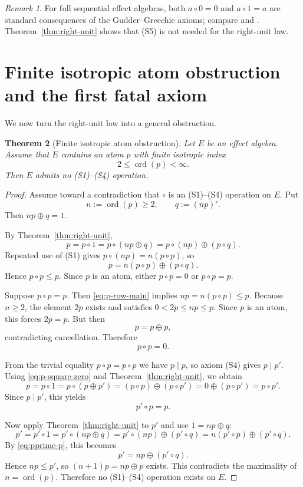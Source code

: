 \documentclass[11pt]{article}
\newtheorem{theorem}{Theorem}[section]
\theoremstyle{definition}
\theoremstyle{remark}
\newtheorem{remark}[theorem]{Remark}
\numberwithin{equation}{section}
\newcommand{\op}{\oplus}
\newcommand{\ord}{\operatorname{ord}}
\begin{document}
\begin{remark}
For full sequential effect algebras, both $a\circ 0=0$ and $a\circ 1=a$ are standard consequences of the Gudder--Greechie axioms; compare \cite[Proposition~3.2]{Tkadlec2008} and \cite[Proposition~17(1)]{WesterbaanEtAl2020}. Theorem~\ref{thm:right-unit} shows that \textup{(S5)} is not needed for the right-unit law.
\end{remark}

\section{Finite isotropic atom obstruction and the first fatal axiom}\label{sec:obstruction}
We now turn the right-unit law into a general obstruction.

\begin{theorem}[Finite isotropic atom obstruction]\label{thm:finite-isotropic-atom}
Let $E$ be an effect algebra. Assume that $E$ contains an atom $p$ with finite isotropic index
\[
2\le \ord(p)<\infty.
\]
Then $E$ admits no \textup{(S1)}--\textup{(S4)} operation.
\end{theorem}

\begin{proof}
Assume toward a contradiction that $\circ$ is an \textup{(S1)}--\textup{(S4)} operation on $E$. Put
\[
n:=\ord(p)\ge 2,
\qquad
q:=(np)'.
\]
Then $np\op q=1$.

By Theorem~\ref{thm:right-unit},
\[
p=p\circ 1=p\circ(np\op q)=p\circ(np)\op(p\circ q).
\]
Repeated use of \textup{(S1)} gives $p\circ(np)=n(p\circ p)$, so
\begin{equation}\label{eq:p-row-main}
p=n(p\circ p)\op(p\circ q).
\end{equation}
Hence $p\circ p\le p$. Since $p$ is an atom, either $p\circ p=0$ or $p\circ p=p$.

Suppose $p\circ p=p$. Then \eqref{eq:p-row-main} implies $np=n(p\circ p)\le p$. Because $n\ge 2$, the element $2p$ exists and satisfies $0<2p\le np\le p$. Since $p$ is an atom, this forces $2p=p$. But then
\[
p=p\op p,
\]
contradicting cancellation. Therefore
\begin{equation}\label{eq:p-square-zero}
p\circ p=0.
\end{equation}

From the trivial equality $p\circ p=p\circ p$ we have $p\mid p$, so axiom \textup{(S4)} gives $p\mid p'$. Using \eqref{eq:p-square-zero} and Theorem~\ref{thm:right-unit}, we obtain
\[
p=p\circ 1=p\circ(p\op p')=(p\circ p)\op(p\circ p')=0\op(p\circ p')=p\circ p'.
\]
Since $p\mid p'$, this yields
\begin{equation}\label{eq:pprime-p}
p'\circ p=p.
\end{equation}

Now apply Theorem~\ref{thm:right-unit} to $p'$ and use $1=np\op q$:
\[
p'=p'\circ 1=p'\circ(np\op q)=p'\circ(np)\op(p'\circ q)=n(p'\circ p)\op(p'\circ q).
\]
By \eqref{eq:pprime-p}, this becomes
\[
p'=np\op(p'\circ q).
\]
Hence $np\le p'$, so $(n+1)p=np\op p$ exists. This contradicts the maximality of $n=\ord(p)$. Therefore no \textup{(S1)}--\textup{(S4)} operation exists on $E$.
\end{proof}
\end{document}
